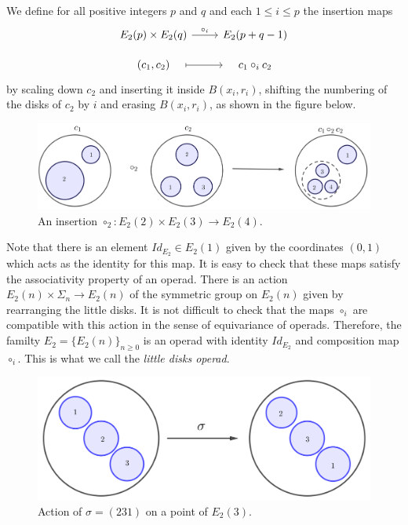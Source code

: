 \documentclass[TFM.tex]{subfiles}
\begin{document}
 
 
 We define for all positive integers $p$ and $q$ and  each $1\leq i\leq p$ the insertion maps 
 \[
 \begin{tikzcd}[row sep=10]
  E_2(p)\times E_2(q)\arrow[r, "\circ_i"] & E_2(p+q-1)\\
  (c_1,c_2)\arrow[r, mapsto, shorten <= 1em, shorten >= 1em] & c_1\circ_i c_2
 \end{tikzcd}
 \]
 by scaling down $c_2$ and inserting it inside $B(x_i,r_i)$, shifting the numbering of the disks of $c_2$ by $i$ and erasing $B(x_i,r_i)$, as shown in the figure below. 
 \begin{figure}[h!]
  \centering
\includegraphics[scale=0.3]{Imagenes/insertion}
\caption{An insertion $\circ_2:E_2(2)\times E_2(3)\to E_2(4)$.}
 \end{figure}
 \newpage

Note that there is an element $Id_{E_2}\in E_2(1)$ given by the coordinates $(0,1)$ which acts as the identity for this map. It is easy to check that these maps satisfy the associativity property of an operad. There is an action $E_2(n)\times \Sigma_n\to E_2(n)$ of the symmetric group on $E_2(n)$ given by rearranging the little disks. It is not difficult to check that the maps $\circ_i$ are compatible with this action in the sense of equivariance of operads. Therefore, the familty $E_2=\{E_2(n)\}_{n\geq 0}$ is an operad with identity $Id_{E_2}$ and composition map $\circ_i$. This is what we call the \emph{little disks operad}.




\begin{figure}[h!]
\includegraphics[scale=0.35]{Imagenes//accion}
\caption{Action of $\sigma=(231)$ on a point of $E_2(3)$.}
\end{figure}
\end{document}
